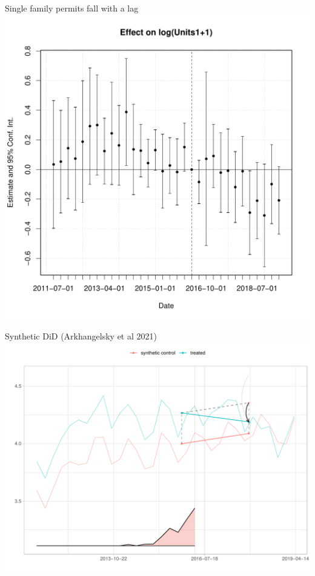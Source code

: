\documentclass[10pt]{beamer}
\begin{document}
\begin{frame}{Single family permits fall with a lag}
    \includegraphics[width=\textwidth, height = \textheight]{figures/eventstudy_units1.pdf}
\end{frame}

\begin{frame}{Synthetic DiD (Arkhangelsky et al 2021)}
    \includegraphics[width=\textwidth, height = \textheight]{figures/synthdid.pdf}
\end{frame}
\end{document}
